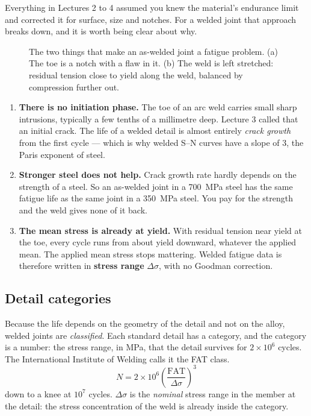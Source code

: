 \documentclass[11pt,a4paper]{article}
\begin{document}
Everything in Lectures 2 to 4 assumed you knew the material's endurance limit and corrected it for
surface, size and notches. For a welded joint that approach breaks down, and it is worth being
clear about why.

\begin{figure}[H]\centering
\resizebox{\textwidth}{!}{}
\caption{The two things that make an as-welded joint a fatigue problem. (a) The toe is a notch
with a flaw in it. (b) The weld is left stretched: residual tension close to yield along the weld,
balanced by compression further out.}
\label{fig:toe}
\end{figure}

\begin{enumerate}[leftmargin=*,itemsep=3pt]
\item \textbf{There is no initiation phase.} The toe of an arc weld carries small sharp intrusions,
  typically a few tenths of a millimetre deep. Lecture 3 called that an initial crack. The life of
  a welded detail is almost entirely \emph{crack growth} from the first cycle --- which is why
  welded S--N curves have a slope of 3, the Paris exponent of steel.
\item \textbf{Stronger steel does not help.} Crack growth rate hardly depends on the strength of a
  steel. So an as-welded joint in a \SI{700}{MPa} steel has the same fatigue life as the same joint
  in a \SI{350}{MPa} steel. You pay for the strength and the weld gives none of it back.
\item \textbf{The mean stress is already at yield.} With residual tension near yield at the toe,
  every cycle runs from about yield downward, whatever the applied mean. The applied mean stress
  stops mattering. Welded fatigue data is therefore written in \textbf{stress range}
  $\Delta\sigma$, with no Goodman correction.
\end{enumerate}

\subsection{Detail categories}

Because the life depends on the geometry of the detail and not on the alloy, welded joints are
\emph{classified}. Each standard detail has a category, and the category is a number: the stress
range, in MPa, that the detail survives for $2\times10^{6}$ cycles. The International Institute of
Welding calls it the FAT class.
\begin{equation}
\boxed{\;N=2\times10^{6}\left(\frac{\mathrm{FAT}}{\Delta\sigma}\right)^{3}\;}
\label{eq:fat}
\end{equation}
down to a knee at $10^{7}$ cycles. $\Delta\sigma$ is the \emph{nominal} stress range in the member
at the detail: the stress concentration of the weld is already inside the category.
\end{document}

